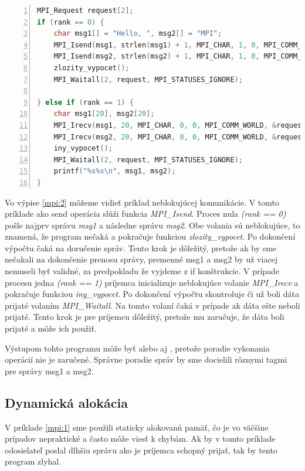 \begin{lstlisting}[language=c, caption={Neblokujúca komunikácia}, label={mpi:2}, numbers=left]
MPI_Request request[2];
if (rank == 0) {
    char msg1[] = "Hello, ", msg2[] = "MPI";
    MPI_Isend(msg1, strlen(msg1) + 1, MPI_CHAR, 1, 0, MPI_COMM_WORLD, &request[0]);
    MPI_Isend(msg2, strlen(msg2) + 1, MPI_CHAR, 1, 0, MPI_COMM_WORLD, &request[1]);
    zlozity_vypocet();
    MPI_Waitall(2, request, MPI_STATUSES_IGNORE);

} else if (rank == 1) {
    char msg1[20], msg2[20];
    MPI_Irecv(msg1, 20, MPI_CHAR, 0, 0, MPI_COMM_WORLD, &request[0]);
    MPI_Irecv(msg2, 20, MPI_CHAR, 0, 0, MPI_COMM_WORLD, &request[1]);
    iny_vypocet();
    MPI_Waitall(2, request, MPI_STATUSES_IGNORE);
    printf("%s%s\n", msg1, msg2);
}
\end{lstlisting}

Vo výpise \ref{mpi:2} môžeme vidieť príklad neblokujúcej komunikácie. V tomto príklade ako send operácia slúži funkcia \textit{MPI\_Isend}.
Proces nula \textit{(rank == 0)} pošle najprv správu \textit{msg1} a následne správu \textit{msg2}.
Obe volania sú neblokujúce, to znamená, že program nečaká
a pokračuje funkciou \textit{zlozity\_vypocet}. Po dokončení výpočtu čaká na doručenie správ.
Tento krok je dôležitý, pretože ak by sme nečakali na dokončenie prenosu správy, premenné msg1 a msg2 by už viacej nemuseli byť validné,
za predpokladu že vyjdeme z if konštrukcie.
V prípade procesu jedna \textit{(rank == 1)} príjemca inicializuje neblokujúce volanie \textit{MPI\_Irecv} a pokračuje funkciou \textit{iny\_vypocet}.
Po dokončení výpočtu skontroluje či už boli dáta prijaté volaním \textit{MPI\_Waitall}.
Na tomto volaní čaká v prípade ak dáta ešte neboli prijaté.
Tento krok je pre príjemcu dôležitý, pretože mu zaručuje, že dáta boli prijaté a môže ich použiť.

Výstupom tohto programu môže byť  alebo aj , pretože poradie vykonania operácií nie je zaručené.
Správne poradie správ by sme docielili rôznymi tagmi pre správy msg1 a msg2.
\subsection{Dynamická alokácia}
V príklade \ref{mpi:1} sme použili staticky alokovanú pamäť, čo je vo väčšine prípadov nepraktické a často môže viesť k chybám.
Ak by v tomto príklade odosielateľ poslal dlhšiu správu ako je príjemca schopný prijať, tak by tento program zlyhal.

